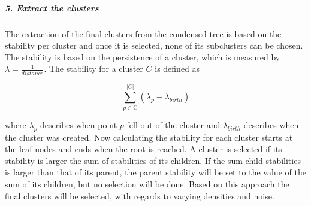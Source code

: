 \subparagraph{5. Extract the clusters}

The extraction of the final clusters from the condensed tree is based on the stability per cluster
and once it is selected, none of its subclusters can be chosen.
The stability is based on the persistence of a cluster,
which is measured by $\lambda = \frac{1}{distance}$. The stability for a cluster $C$ is defined as

\begin{equation}
\sum_{p \in \text{C}}^{|C|} ({\lambda}_{p} - {\lambda}_{birth})
\end{equation}

where ${\lambda}_{p}$ describes when point $p$ fell out of the cluster and $ {\lambda}_{birth}$ describes when the cluster was created.
Now calculating the stability for each cluster starts at the leaf nodes and ends when the root is reached.
A cluster is selected if its stability is larger the sum of stabilities of its children.
If the sum child stabilities is larger than that of its parent,
the parent stability will be set to the value of the sum of its children,
but no selection will be done.
Based on this approach the final clusters will be selected, with regards to varying densities and noise.
